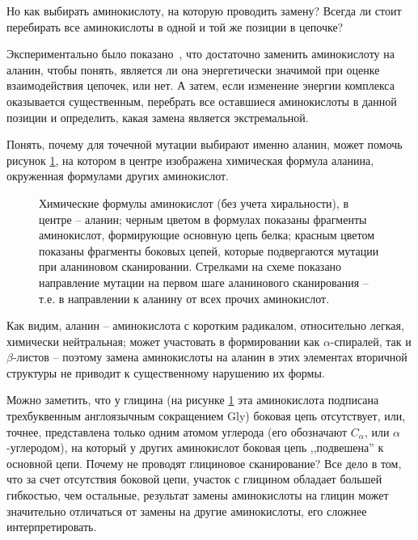 Но как выбирать аминокислоту, на которую проводить замену? Всегда ли стоит перебирать все аминокислоты в одной и той же позиции в цепочке?

Экспериментально было показано~\cite{alascan2001}, что достаточно заменить аминокислоту на аланин, чтобы понять, является ли она энергетически значимой при оценке взаимодействия цепочек, или нет. А затем, если изменение энергии комплекса  оказывается существенным, перебрать все оставшиеся аминокислоты в данной позиции и определить, какая замена является экстремальной.

Понять, почему для точечной мутации выбирают именно аланин, может помочь рисунок \ref{fig:aminoacids}, на котором в центре изображена химическая формула аланина, окруженная формулами других аминокислот.

\begin{figure}
 \resizebox{!}{0.9\textwidth}{
 \ttfamily
 \footnotesize
 \aapicture
 }
\caption{\small{Химические формулы аминокислот (без учета хиральности), в центре -- аланин; черным цветом в формулах показаны фрагменты аминокислот, формирующие основную цепь белка; красным цветом показаны фрагменты боковых цепей, которые подвергаются мутации при аланиновом сканировании. Стрелками на схеме показано направление мутации на первом шаге аланинового сканирования -- т.е. в направлении к аланину от всех прочих аминокислот. }}
\label{fig:aminoacids}
\end{figure}

Как видим, аланин -- аминокислота с коротким радикалом, относительно легкая, химически нейтральная; может участовать в формировании как $\alpha$-спиралей, так и $\beta$-листов -- поэтому замена аминокислоты на аланин в этих элементах вторичной структуры не приводит к существенному нарушению их формы.

Можно заметить, что у глицина (на рисунке \ref{fig:aminoacids} эта аминокислота подписана трехбуквенным англоязычным сокращением Gly) боковая цепь отсутствует, или, точнее, представлена только одним атомом углерода (его обозначают $C_\alpha$, или $\alpha$-углеродом), на который у других аминокислот боковая цепь ,,подвешена'' к основной цепи. Почему не проводят глициновое сканирование? Все дело в том, что за счет отсутствия боковой цепи, участок с глицином обладает большей гибкостью, чем остальные, результат замены аминокислоты на глицин может значительно отличаться от замены на другие аминокислоты, его сложнее интерпретировать.

